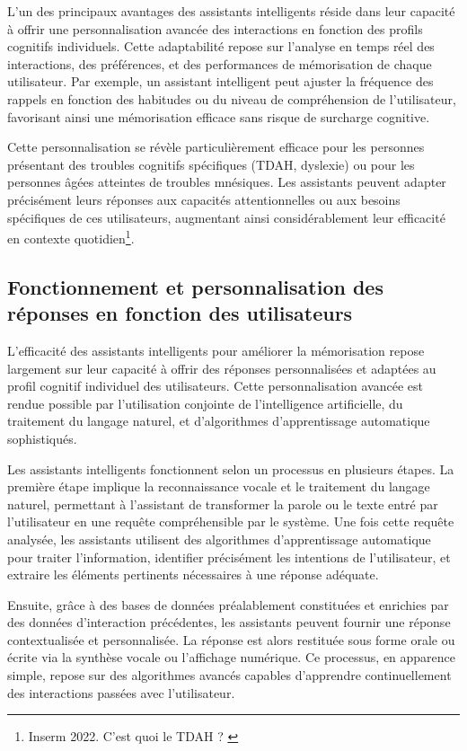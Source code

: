 \documentclass[11pt,a4paper]{report}
\begin{document}
L’un des principaux avantages des assistants intelligents réside dans leur capacité à offrir une personnalisation avancée des interactions en fonction des profils cognitifs individuels. Cette adaptabilité repose sur l’analyse en temps réel des interactions, des préférences, et des performances de mémorisation de chaque utilisateur. Par exemple, un assistant intelligent peut ajuster la fréquence des rappels en fonction des habitudes ou du niveau de compréhension de l'utilisateur, favorisant ainsi une mémorisation efficace sans risque de surcharge cognitive.

Cette personnalisation se révèle particulièrement efficace pour les personnes présentant des troubles cognitifs spécifiques (TDAH, dyslexie) ou pour les personnes âgées atteintes de troubles mnésiques. Les assistants peuvent adapter précisément leurs réponses aux capacités attentionnelles ou aux besoins spécifiques de ces utilisateurs, augmentant ainsi considérablement leur efficacité en contexte quotidien\footnote{Inserm 2022. C’est quoi le TDAH ? \cite{inserm3}}.

\subsection{Fonctionnement et personnalisation des réponses en fonction des utilisateurs}

L’efficacité des assistants intelligents pour améliorer la mémorisation repose largement sur leur capacité à offrir des réponses personnalisées et adaptées au profil cognitif individuel des utilisateurs. Cette personnalisation avancée est rendue possible par l’utilisation conjointe de l’intelligence artificielle, du traitement du langage naturel, et d’algorithmes d’apprentissage automatique sophistiqués.

Les assistants intelligents fonctionnent selon un processus en plusieurs étapes. La première étape implique la reconnaissance vocale et le traitement du langage naturel, permettant à l’assistant de transformer la parole ou le texte entré par l’utilisateur en une requête compréhensible par le système. Une fois cette requête analysée, les assistants utilisent des algorithmes d’apprentissage automatique pour traiter l'information, identifier précisément les intentions de l’utilisateur, et extraire les éléments pertinents nécessaires à une réponse adéquate.

Ensuite, grâce à des bases de données préalablement constituées et enrichies par des données d’interaction précédentes, les assistants peuvent fournir une réponse contextualisée et personnalisée. La réponse est alors restituée sous forme orale ou écrite via la synthèse vocale ou l’affichage numérique. Ce processus, en apparence simple, repose sur des algorithmes avancés capables d’apprendre continuellement des interactions passées avec l’utilisateur.
\end{document}
